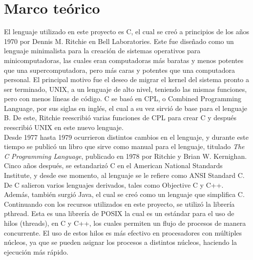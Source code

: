 \documentclass[12pt, article, natbib]{IEEEtran}
\begin{document}
\section{Marco teórico}
El lenguaje utilizado en este proyecto es C, el cual se creó a principios de los años 1970 por Dennis M. Ritchie en Bell Laboratories. Este fue diseñado como un lenguaje minimalista para la creación de sistemas operativos para minicomputadoras, las cuales eran computadoras más baratas y menos potentes que una supercomputadora, pero más caras y potentes que una computadora personal. El principal motivo fue el deseo de migrar el kernel del sistema pronto a ser terminado, UNIX, a un lenguaje de alto nivel, teniendo las mismas funciones, pero con menos líneas de código. C se basó en CPL, o Combined Programming Language, por sus siglas en inglés, el cual a su vez sirvió de base para el lenguaje B. De este, Ritchie reescribió varias funciones de CPL para crear C y después reescribió UNIX en este nuevo lenguaje.\cite{encyclopdiabritannica_2022_c} \cite{munoz_after}\\

Desde 1977 hasta 1979 ocurrieron distintos cambios en el lenguaje, y durante este tiempo se publicó un libro que sirve como manual para el lenguaje, titulado \textit{The C Programming Language}, publicado en 1978 por Ritchie y Brian W. Kernighan. Cinco años después, se estandarizó C en el American National Standards Institute, y desde ese momento, al lenguaje se le refiere como ANSI Standard C. De C salieron varios lenguajes derivados, tales como Objective C y C++. Además, también surgió Java, el cual se creó como un lenguaje que simplifica C.\cite{mritchie_1993_the}\\

Continuando con los recursos utilizados en este proyecto, se utilizó la librería pthread. Esta es una librería de POSIX la cual es un estándar para el uso de hilos (threads), en C y C++, los cuales permiten un flujo de procesos de manera concurrente. El uso de estos hilos es más efectivo en procesadores con múltiples núcleos, ya que se pueden asignar los procesos a distintos núcleos, haciendo la ejecución más rápido.\cite{ippolito_2020_linux}\\
\end{document}
